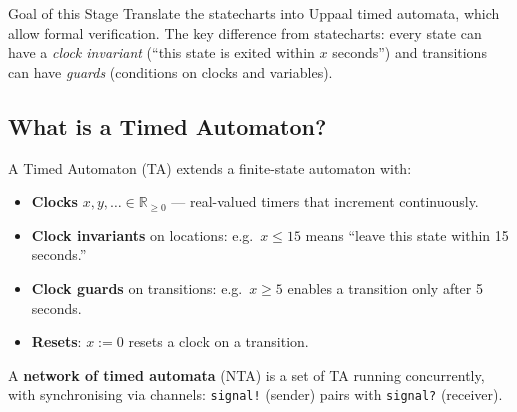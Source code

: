 \documentclass[11pt, a4paper]{article}
\begin{document}
\begin{infobox}{Goal of this Stage}
Translate the statecharts into Uppaal timed automata, which allow formal verification.
The key difference from statecharts: every state can have a \emph{clock invariant}
(``this state is exited within $x$ seconds'') and transitions can have \emph{guards}
(conditions on clocks and variables).
\end{infobox}

\subsection{What is a Timed Automaton?}

A Timed Automaton (TA) extends a finite-state automaton with:
\begin{itemize}
  \item \textbf{Clocks} $x, y, \ldots \in \mathbb{R}_{\geq 0}$ — real-valued timers that increment continuously.
  \item \textbf{Clock invariants} on locations: e.g.\ $x \leq 15$ means ``leave this
        state within 15 seconds.''
  \item \textbf{Clock guards} on transitions: e.g.\ $x \geq 5$ enables a transition only
        after 5 seconds.
  \item \textbf{Resets}: $x := 0$ resets a clock on a transition.
\end{itemize}

A \textbf{network of timed automata} (NTA) is a set of TA running concurrently, with
synchronising via channels: \texttt{signal!} (sender) pairs with \texttt{signal?} (receiver).



\end{document}
